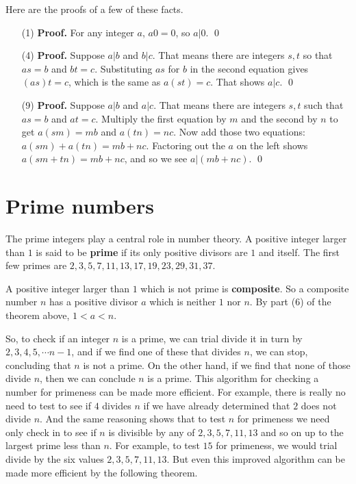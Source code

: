 Here are the proofs of a few of these facts.
\begin{enumerate}\itshape
 \item[(1)] \textbf{Proof.} For any integer $a$, $a0 = 0$, so $a|0$. \qed
 
 \item[(4)] \textbf{Proof.} Suppose $a|b$ and $b|c$. That means there are
 integers $s,t$ so that $as=b$ and $bt=c$. Substituting $as$ for $b$ in the
 second equation gives $(as)t = c$, which is the same as $a(st) = c$. 
 That shows $a|c$. \qed
 
 \item[(9)] \textbf{Proof.} Suppose $a|b$ and $a|c$. That means
 there are integers $s,t$ such that $as=b$ and $at=c$. Multiply
 the first equation by $m$ and the second by $n$ to get
 $a(sm)= mb$ and $a(tn) = nc$. Now add those two equations:
 $a(sm) + a(tn) = mb+nc$. Factoring out the $a$ on the left shows
 $a(sm+tn) = mb+nc$, and so we see $a|(mb+nc)$. \qed
\end{enumerate}


\section{Prime numbers}
The prime integers play a central role in number theory.
A positive integer larger than $1$ is said to be { \bfseries prime} if its only positive divisors are $1$ and
itself. The first few primes are $2,3,5,7,11,13,17,19,23,29,31,37$.


A positive integer larger than $1$ which is not prime is { \bfseries composite}. So a composite number
$n$ has a positive divisor $a$ which is neither $1$ nor $n$. By part (6) of the theorem above, $1<a<n$. 

So, to check if an integer $n$ is a prime, we can trial divide it in turn by 
$2,3,4,5,\cdots n-1$, and if we find one of these that divides $n$, we
can stop, concluding that $n$ is not a prime. On the other hand,
if we find that none of those divide $n$, then we can conclude $n$
is a prime. This algorithm for checking a number for primeness can
be made more efficient. For example, there is really no need to test to see
if $4$ divides $n$ if we have already determined that $2$ does not divide
$n$. And the same reasoning shows that to test $n$ for primeness
we need only check in to see if $n$ is divisible by any of
$2,3,5,7,11,13$ and so on up to the largest prime less than $n$.
For example, to test $15$ for primeness, we would trial divide by
the six values $2,3,5,7,11,13$. But even this improved algorithm can 
be made more efficient by the following theorem.


